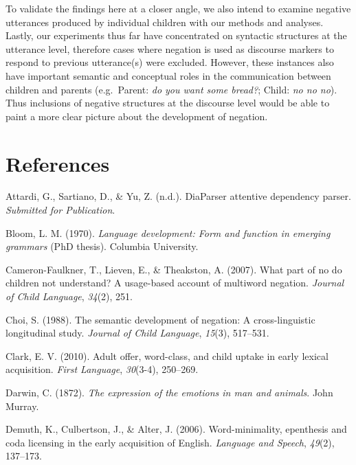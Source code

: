 \documentclass[10pt, letterpaper]{article}
\begin{document}
To validate the findings here at a closer angle, we also intend to
examine negative utterances produced by individual children with our
methods and analyses. Lastly, our experiments thus far have concentrated
on syntactic structures at the utterance level, therefore cases where
negation is used as discourse markers to respond to previous
utterance(s) were excluded. However, these instances also have important
semantic and conceptual roles in the communication between children and
parents (e.g.~Parent: \emph{do you want some bread?}; Child: \emph{no no
no}). Thus inclusions of negative structures at the discourse level
would be able to paint a more clear picture about the development of
negation.

\hypertarget{references}{%
\section{References}\label{references}}

\setlength{\parindent}{-0.1in} 
\setlength{\leftskip}{0.125in}

\noindent

\hypertarget{refs}{}
\leavevmode\hypertarget{ref-diaparser}{}%
Attardi, G., Sartiano, D., \& Yu, Z. (n.d.). DiaParser attentive
dependency parser. \emph{Submitted for Publication}.

\leavevmode\hypertarget{ref-bloom1970language}{}%
Bloom, L. M. (1970). \emph{Language development: Form and function in
emerging grammars} (PhD thesis). Columbia University.

\leavevmode\hypertarget{ref-cameron2007part}{}%
Cameron-Faulkner, T., Lieven, E., \& Theakston, A. (2007). What part of
no do children not understand? A usage-based account of multiword
negation. \emph{Journal of Child Language}, \emph{34}(2), 251.

\leavevmode\hypertarget{ref-choi1988semantic}{}%
Choi, S. (1988). The semantic development of negation: A
cross-linguistic longitudinal study. \emph{Journal of Child Language},
\emph{15}(3), 517--531.

\leavevmode\hypertarget{ref-clark2010adult}{}%
Clark, E. V. (2010). Adult offer, word-class, and child uptake in early
lexical acquisition. \emph{First Language}, \emph{30}(3-4), 250--269.

\leavevmode\hypertarget{ref-darwin1872expression}{}%
Darwin, C. (1872). \emph{The expression of the emotions in man and
animals}. John Murray.

\leavevmode\hypertarget{ref-demuth2006word}{}%
Demuth, K., Culbertson, J., \& Alter, J. (2006). Word-minimality,
epenthesis and coda licensing in the early acquisition of English.
\emph{Language and Speech}, \emph{49}(2), 137--173.
\end{document}
